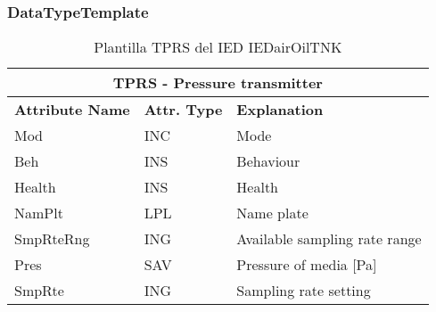     \subsubsection{DataTypeTemplate}
    \begin{table}[H]
    \begin{center}
    \begin{tabular}{|l|l|p{8.5cm}|}
            \hline
            \multicolumn{3}{|c|}{\cellcolor[gray]{0.8} \textbf{ TPRS}  - Pressure transmitter} \\
            \hline
            \textbf{Attribute Name} & \textbf{Attr. Type} & \textbf{Explanation} \\
            \hline 
            Mod & INC & Mode \\
            \hline
            Beh & INS & Behaviour \\
            \hline
            Health & INS & Health \\
            \hline
            NamPlt & LPL & Name plate \\
            \hline
            SmpRteRng & ING & Available sampling rate range \\
            \hline
            Pres & SAV & Pressure of media [Pa] \\
            \hline
            SmpRte & ING & Sampling rate setting \\
            \hline
    \end{tabular}
    \caption{Plantilla TPRS del IED IEDairOilTNK}
    \label{table:lnTypeTPRS_trans}
    \end{center}
    \end{table}
    
    
    